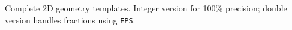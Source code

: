 
Complete 2D geometry templates. Integer version for 100\% precision; double version handles fractions using \lstinline|EPS|. 





